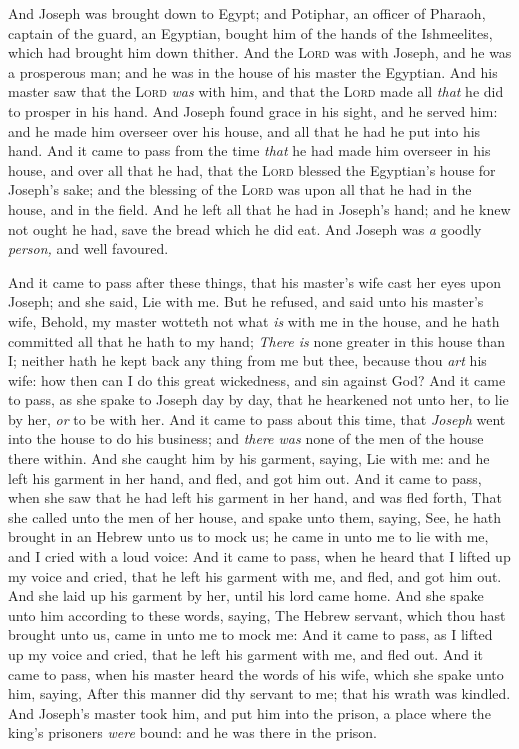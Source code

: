 \documentclass[11pt,letterpaper,oneside]{memoir}
\begin{document}
And Joseph was brought down to Egypt; and Potiphar, an officer of
Pharaoh, captain of the guard, an Egyptian, bought him of the hands of
the Ishmeelites, which had brought him down thither. And the \textsc{Lord}
was with Joseph, and he was a prosperous man; and he was in the house of
his master the Egyptian. And his master saw that the \textsc{Lord}
\emph{was} with him, and that the \textsc{Lord} made all \emph{that} he
did to prosper in his hand. And Joseph found grace in his sight, and he
served him: and he made him overseer over his house, and all that he had
he put into his hand. And it came to pass from the time \emph{that} he
had made him overseer in his house, and over all that he had, that the
\textsc{Lord} blessed the Egyptian's house for Joseph's sake; and the
blessing of the \textsc{Lord} was upon all that he had in the house, and
in the field. And he left all that he had in Joseph's hand; and he knew
not ought he had, save the bread which he did eat. And Joseph was
\emph{a} goodly \emph{person,} and well favoured.

And it came to pass after these things, that his master's wife cast her
eyes upon Joseph; and she said, Lie with me. But he refused, and said
unto his master's wife, Behold, my master wotteth not what \emph{is}
with me in the house, and he hath committed all that he hath to my hand;
\emph{There is} none greater in this house than I; neither hath he kept
back any thing from me but thee, because thou \emph{art} his wife: how
then can I do this great wickedness, and sin against God? And it came to
pass, as she spake to Joseph day by day, that he hearkened not unto her,
to lie by her, \emph{or} to be with her. And it came to pass about this
time, that \emph{Joseph} went into the house to do his business; and
\emph{there was} none of the men of the house there within. And she
caught him by his garment, saying, Lie with me: and he left his garment
in her hand, and fled, and got him out. And it came to pass, when she
saw that he had left his garment in her hand, and was fled forth, That
she called unto the men of her house, and spake unto them, saying, See,
he hath brought in an Hebrew unto us to mock us; he came in unto me to
lie with me, and I cried with a loud voice: And it came to pass, when he
heard that I lifted up my voice and cried, that he left his garment with
me, and fled, and got him out. And she laid up his garment by her, until
his lord came home. And she spake unto him according to these words,
saying, The Hebrew servant, which thou hast brought unto us, came in
unto me to mock me: And it came to pass, as I lifted up my voice and
cried, that he left his garment with me, and fled out. And it came to
pass, when his master heard the words of his wife, which she spake unto
him, saying, After this manner did thy servant to me; that his wrath was
kindled. And Joseph's master took him, and put him into the prison, a
place where the king's prisoners \emph{were} bound: and he was there in
the prison.
\end{document}
